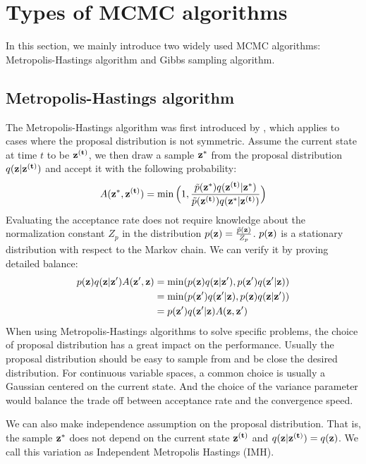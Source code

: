 \section{Types of MCMC algorithms}
In this section, we mainly introduce two widely used MCMC algorithms: Metropolis-Hastings algorithm and Gibbs sampling algorithm.
\subsection{Metropolis-Hastings algorithm}
The Metropolis-Hastings algorithm was first introduced by , which applies to cases where the proposal distribution is not symmetric.
Assume the current state at time $t$ to be ${\bf z^{(t)}}$, we then draw a sample ${\bf z^{*}}$ from the proposal distribution $q({\bf z}| {\bf z^{(t)}})$ and accept it with the following probability:
$$A({\bf z^{*}}, {\bf z^{(t)}})= \min \Big(1, \frac{\tilde{p}({\bf z^{*}})q({\bf z^{(t)}}| {\bf z^{*}})}{\tilde{p}({\bf z^{(t)}})q({\bf z^{*}}| {\bf z^{(t)}})}\Big)$$
Evaluating the acceptance rate does not require knowledge about the normalization constant $Z_p$ in the distribution $p({\bf z})=\frac{\tilde{p}({\bf z})}{Z_p}$. $p({\bf z})$ is a stationary distribution with respect
to the Markov chain. We can verify it by proving detailed balance:
\begin{equation}
\begin{split}
    p({\bf z}) q({\bf z}|{\bf z'}) A({\bf z'}, {\bf z}) &= \min (p({\bf z})q({\bf z}|{\bf z'}),p({\bf z'})q({\bf z'}|{\bf z})) \\ &= \min (p({\bf z'})q({\bf z'}|{\bf z}), p({\bf z})q({\bf z}|{\bf z'})) \\ &= p({\bf z'}) q({\bf z'}|{\bf z}) A({\bf z}, {\bf z'})
\end{split}
\end{equation}
When using Metropolis-Hastings algorithms to solve specific problems, the choice of proposal distribution has a great impact on the performance. 
Usually the proposal distribution should be easy to sample from and be close the desired distribution. For continuous variable spaces, a common choice is usually a Gaussian centered on
the current state. And the choice of the variance parameter would balance the trade off between acceptance rate and the convergence speed.


We can also make independence assumption on the proposal distribution. That is, the sample ${\bf z^{*}}$ does not depend on the current state ${\bf z^{(t)}}$ and $q({\bf z}| {\bf z^{(t)}}) = q({\bf z})$. We call this variation as Independent Metropolis Hastings (IMH).
